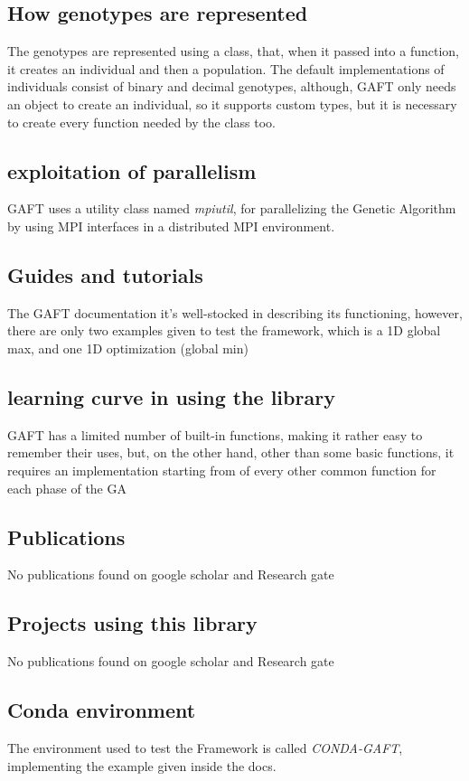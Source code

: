 \documentclass{article}
\begin{document}
\subsection{How genotypes are represented}
The genotypes are represented using a class, that, when it passed into a function, it creates an individual and then a population. The default implementations of individuals consist of binary and decimal genotypes, although, GAFT only needs an object to create an individual, so it supports custom types, but it is necessary to create every function needed by the class too.
\subsection{exploitation of parallelism}
GAFT uses a utility class named \textit{mpiutil}, for parallelizing the Genetic Algorithm by using MPI interfaces in a distributed MPI environment.
\subsection{Guides and tutorials}
The GAFT documentation it's well-stocked in describing its functioning, however, there are only two examples given to test the framework, which is a 1D global max, and one 1D optimization (global min)
\subsection{learning curve in using the library}
GAFT has a limited number of built-in functions, making it rather  easy to remember their uses, but, on the other hand, other than some basic functions, it requires an implementation starting from of every other common function for each phase of the GA
\subsection{Publications}
No publications found on google scholar and Research gate
\subsection{Projects using this library}
No publications found on google scholar and Research gate
\subsection{Conda environment}
The environment used to test the Framework is called \textit{CONDA-GAFT}, implementing the example given inside the docs. 
\end{document}
